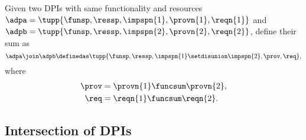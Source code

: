 \begin{definition}
    \label{def:parallel-1}
    Given two DPIs with same functionality and resources~$\adpa=\tupp{\funsp,\ressp,\impspn{1},\provn{1},\reqn{1}}$ and~$\adpb=\tupp{\funsp,\ressp,\impspn{2},\provn{2},\reqn{2}}$, define their sum as
    \begin{equation}
        \adpa\join\adpb\definedas\tupp{\funsp,\ressp,\impspn{1}\setdisunion\impspn{2},\prov,\req} ,
    \end{equation}
    where
    \begin{equation}
        \begin{aligned}
            \prov & = \provn{1} \funcsum \provn{2}, \\
            \req  & = \reqn{1} \funcsum \reqn{2}.
        \end{aligned}
    \end{equation}

\end{definition}

%

\subsection{Intersection of DPIs}

\begin{marginfigure}
    \centering
    \caption{}
    \label{fig:intersection}
\end{marginfigure}

